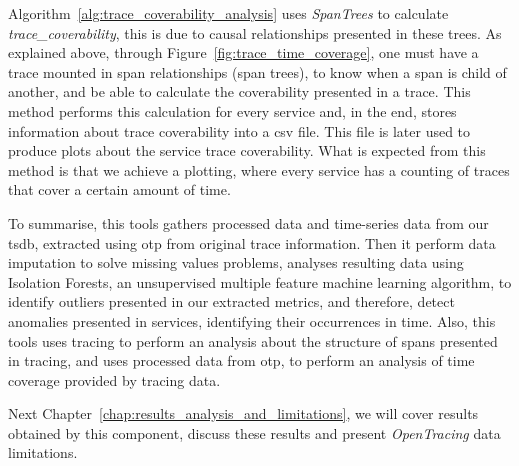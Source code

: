 Algorithm~\ref{alg:trace_coverability_analysis} uses \emph{SpanTrees} to calculate \emph{trace\_coverability}, this is due to causal relationships presented in these trees. As explained above, through Figure~\ref{fig:trace_time_coverage}, one must have a trace mounted in span relationships (span trees), to know when a span is child of another, and be able to calculate the coverability presented in a trace. This method performs this calculation for every service and, in the end, stores information about trace coverability into a \gls{csv} file. This file is later used to produce plots about the service trace coverability. What is expected from this method is that we achieve a plotting, where every service has a counting of traces that cover a certain amount of time.


To summarise, this tools gathers processed data and time-series data from our \gls{tsdb}, extracted using \gls{otp} from original trace information. Then it perform data imputation to solve missing values problems, analyses resulting data using Isolation Forests, an unsupervised multiple feature machine learning algorithm, to identify outliers presented in our extracted metrics, and therefore, detect anomalies presented in services, identifying their occurrences in time. Also, this tools uses tracing to perform an analysis about the structure of spans presented in tracing, and uses processed data from \gls{otp}, to perform an analysis of time coverage provided by tracing data.

Next Chapter~\ref{chap:results_analysis_and_limitations}, we will cover results obtained by this component, discuss these results and present \emph{OpenTracing} data limitations.

\checkoddpage
{}
{
    \newpage
    \blankpage
}
{
}